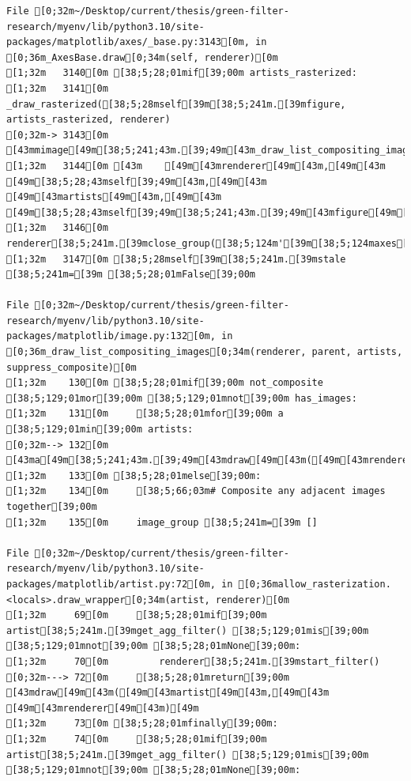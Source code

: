 \documentclass[
  letterpaper,
  DIV=11,
  numbers=noendperiod]{scrartcl}
\begin{document}
\begin{verbatim}
File [0;32m~/Desktop/current/thesis/green-filter-research/myenv/lib/python3.10/site-packages/matplotlib/axes/_base.py:3143[0m, in [0;36m_AxesBase.draw[0;34m(self, renderer)[0m
[1;32m   3140[0m [38;5;28;01mif[39;00m artists_rasterized:
[1;32m   3141[0m     _draw_rasterized([38;5;28mself[39m[38;5;241m.[39mfigure, artists_rasterized, renderer)
[0;32m-> 3143[0m [43mmimage[49m[38;5;241;43m.[39;49m[43m_draw_list_compositing_images[49m[43m([49m
[1;32m   3144[0m [43m    [49m[43mrenderer[49m[43m,[49m[43m [49m[38;5;28;43mself[39;49m[43m,[49m[43m [49m[43martists[49m[43m,[49m[43m [49m[38;5;28;43mself[39;49m[38;5;241;43m.[39;49m[43mfigure[49m[38;5;241;43m.[39;49m[43msuppressComposite[49m[43m)[49m
[1;32m   3146[0m renderer[38;5;241m.[39mclose_group([38;5;124m'[39m[38;5;124maxes[39m[38;5;124m'[39m)
[1;32m   3147[0m [38;5;28mself[39m[38;5;241m.[39mstale [38;5;241m=[39m [38;5;28;01mFalse[39;00m

File [0;32m~/Desktop/current/thesis/green-filter-research/myenv/lib/python3.10/site-packages/matplotlib/image.py:132[0m, in [0;36m_draw_list_compositing_images[0;34m(renderer, parent, artists, suppress_composite)[0m
[1;32m    130[0m [38;5;28;01mif[39;00m not_composite [38;5;129;01mor[39;00m [38;5;129;01mnot[39;00m has_images:
[1;32m    131[0m     [38;5;28;01mfor[39;00m a [38;5;129;01min[39;00m artists:
[0;32m--> 132[0m         [43ma[49m[38;5;241;43m.[39;49m[43mdraw[49m[43m([49m[43mrenderer[49m[43m)[49m
[1;32m    133[0m [38;5;28;01melse[39;00m:
[1;32m    134[0m     [38;5;66;03m# Composite any adjacent images together[39;00m
[1;32m    135[0m     image_group [38;5;241m=[39m []

File [0;32m~/Desktop/current/thesis/green-filter-research/myenv/lib/python3.10/site-packages/matplotlib/artist.py:72[0m, in [0;36mallow_rasterization.<locals>.draw_wrapper[0;34m(artist, renderer)[0m
[1;32m     69[0m     [38;5;28;01mif[39;00m artist[38;5;241m.[39mget_agg_filter() [38;5;129;01mis[39;00m [38;5;129;01mnot[39;00m [38;5;28;01mNone[39;00m:
[1;32m     70[0m         renderer[38;5;241m.[39mstart_filter()
[0;32m---> 72[0m     [38;5;28;01mreturn[39;00m [43mdraw[49m[43m([49m[43martist[49m[43m,[49m[43m [49m[43mrenderer[49m[43m)[49m
[1;32m     73[0m [38;5;28;01mfinally[39;00m:
[1;32m     74[0m     [38;5;28;01mif[39;00m artist[38;5;241m.[39mget_agg_filter() [38;5;129;01mis[39;00m [38;5;129;01mnot[39;00m [38;5;28;01mNone[39;00m:


\end{verbatim}
\end{document}
